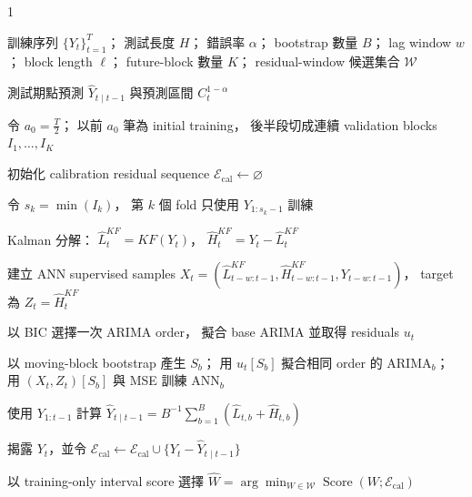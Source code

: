 \begin{algorithm}[htbp]
\caption{Kalman--ARIMA--ANN Out-of-Time Adaptive EnbPI}
\label{alg:kf-oot-enbpi}

\begin{spacing}{1}

\begin{algorithmic}[1]

\Require
訓練序列 $\{Y_t\}_{t=1}^{T}$；
測試長度 $H$；
錯誤率 $\alpha$；
bootstrap 數量 $B$；
lag window $w$；
block length $\ell$；
future-block 數量 $K$；
residual-window 候選集合 $\mathcal W$

\Ensure
測試期點預測 $\widehat Y_{t\mid t-1}$
與預測區間 $C_t^{1-\alpha}$

\State
令 $a_0=\frac{T}{2}$；
以前 $a_0$ 筆為 initial training，
後半段切成連續 validation blocks $I_1,\ldots,I_K$

\State
初始化 calibration residual sequence $\mathcal E_{\mathrm{cal}}\gets\varnothing$


    \State
    令 $s_k=\min(I_k)$，
    第 $k$ 個 fold 只使用 $Y_{1:s_k-1}$ 訓練

    \State
    Kalman 分解：
    $\widehat L_t^{KF}=KF(Y_t)$，
    $\widehat H_t^{KF}=Y_t-\widehat L_t^{KF}$

    \State
    建立 ANN supervised samples 
    $X_t=(\widehat L_{t-w:t-1}^{KF},
    \widehat H_{t-w:t-1}^{KF},Y_{t-w:t-1})$，
    target 為 $Z_t=\widehat H_t^{KF}$

    \State
    以 BIC 選擇一次 ARIMA order，
    擬合 base ARIMA 並取得 residuals $u_t$


        \State
        以 moving-block bootstrap 產生 $S_b$；
        用 $u_t[S_b]$ 擬合相同 order 的 ARIMA$_b$；
        用 $(X_t,Z_t)[S_b]$ 與 MSE 訓練 ANN$_b$

    \EndFor


        \State
        使用 $Y_{1:t-1}$ 計算
        $\widehat Y_{t\mid t-1}
        =B^{-1}\sum_{b=1}^{B}
        (\widehat L_{t,b}+\widehat H_{t,b})$

        \State
        揭露 $Y_t$，並令
        $\mathcal E_{\mathrm{cal}}
        \gets\mathcal E_{\mathrm{cal}}
        \cup\{Y_t-\widehat Y_{t\mid t-1}\}$

    \EndFor
\EndFor

\State
以 training-only interval score 選擇
$\widehat W
=\arg\min_{W\in\mathcal W}
\operatorname{Score}(W;\mathcal E_{\mathrm{cal}})$


\end{algorithmic}
\end{spacing}
\end{algorithm}
